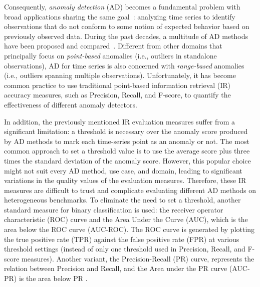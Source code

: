 Consequently, \textit{anomaly detection} (AD) becomes a fundamental problem with broad applications sharing the same goal~\cite{statisticaloutliers,DBLP:conf/vldb/SubramaniamPPKG06,DBLP:conf/icdm/YehZUBDDSMK16}: analyzing time series to identify observations that do not conform to some notion of expected behavior based on previously observed data. During the past decades, a multitude of AD methods have been proposed and compared~\cite{yeh_time_2018,DBLP:journals/datamine/LinardiZPK20,DBLP:conf/icde/BoniolLRP20a,DBLP:conf/edbt/Gao0B20,boniol_unsupervised_2021,boniol2021sandaction,Series2GraphPaper,DBLP:journals/pvldb/BoniolPPF21,DBLP:conf/icdm/YehZUBDDSMK16,Liu:2008:IF:1510528.1511387,breunig_lof_2000,DBLP:journals/csur/Blazquez-Garcia21,DBLP:journals/pvldb/PaparrizosKBTPF22,theseus}. Different from other domains that principally focus on \textit{point-based} anomalies (i.e., outliers in standalone observations), AD for time series is also concerned with \textit{range-based} anomalies (i.e., outliers spanning multiple observations). 
Unfortunately, it has become common practice to use traditional point-based information retrieval (IR) accuracy measures, such as Precision, Recall, and F-score, to quantify the effectiveness of different anomaly detectors.



In addition, the previously mentioned IR evaluation measures suffer from a significant limitation: a threshold is necessary over the anomaly score produced by AD methods to mark each time-series point as an anomaly or not. The most common approach to set a threshold value is to use the average score plus three times the standard deviation of the anomaly score. However, this popular choice might not suit every AD method, use case, and domain, leading to significant variations in the quality values of the evaluation measures. Therefore, these IR measures are difficult to trust and complicate evaluating different AD methods on heterogeneous benchmarks. To eliminate the need to set a threshold, another standard measure for binary classification is used: the receiver operator characteristic (ROC) curve and the Area Under the Curve (AUC), which is the area below the ROC curve (AUC-ROC). The ROC curve is generated by plotting the true positive rate (TPR) against the false positive rate (FPR) at various threshold settings (instead of only one threshold used in Precision, Recall, and F-score measures). Another variant, the Precision-Recall (PR) curve, represents the relation between Precision and Recall, and the Area under the PR curve (AUC-PR) is the area below PR \cite{10.1145/1143844.1143874}.



